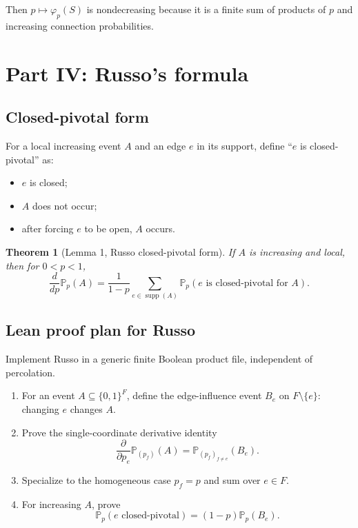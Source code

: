 \documentclass[11pt]{article}
\newcommand{\PP}{\mathbb P}
\newcommand{\supp}{\operatorname{supp}}
\theoremstyle{definition}
\theoremstyle{plain}
\newtheorem{theorem}[definition]{Theorem}
\begin{document}
Then $p\mapsto\varphi_p(S)$ is nondecreasing because it is a finite sum of products of $p$ and increasing connection probabilities.

\section{Part IV: Russo's formula}

\subsection{Closed-pivotal form}

For a local increasing event $A$ and an edge $e$ in its support, define ``$e$ is closed-pivotal'' as:
\begin{itemize}[leftmargin=1.4em]
  \item $e$ is closed;
  \item $A$ does not occur;
  \item after forcing $e$ to be open, $A$ occurs.
\end{itemize}

\begin{theorem}[Lemma 1, Russo closed-pivotal form]
If $A$ is increasing and local, then for $0<p<1$,
\[
  \frac{d}{dp}\PP_p(A)
  =\frac{1}{1-p}\sum_{e\in\supp(A)}
     \PP_p(e\text{ is closed-pivotal for }A).
\]
\end{theorem}

\subsection{Lean proof plan for Russo}

Implement Russo in a generic finite Boolean product file, independent of percolation.

\begin{enumerate}[leftmargin=1.4em]
  \item For an event $A\subseteq\{0,1\}^F$, define the edge-influence event $B_e$ on $F\setminus\{e\}$: changing $e$ changes $A$.
  \item Prove the single-coordinate derivative identity
  \[
    \frac{\partial}{\partial p_e}\PP_{(p_f)}(A)=\PP_{(p_f)_{f\ne e}}(B_e).
  \]
  \item Specialize to the homogeneous case $p_f=p$ and sum over $e\in F$.
  \item For increasing $A$, prove
  \[
    \PP_p(e\text{ closed-pivotal})=(1-p)\PP_p(B_e).
  \]
\end{enumerate}
\end{document}
